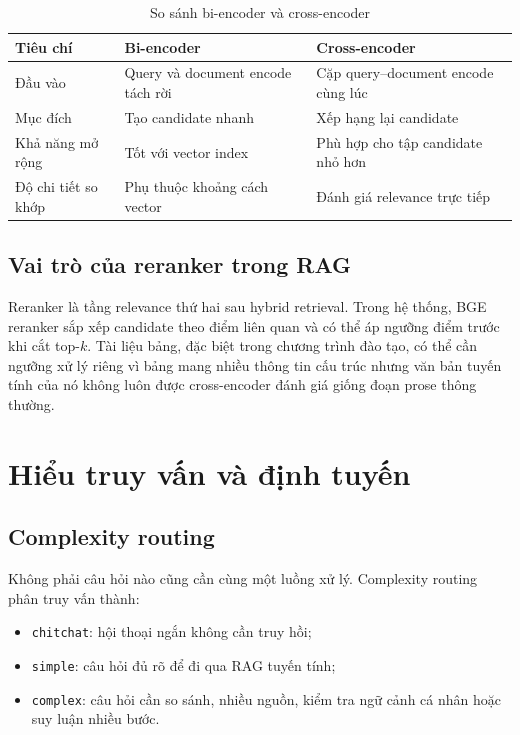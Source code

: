 \documentclass[../DoAn.tex]{subfiles}
\begin{document}
\begin{table}[h]
\centering
\begin{tabular}{|l|p{4.2cm}|p{4.2cm}|}
\hline
\textbf{Tiêu chí} & \textbf{Bi-encoder} & \textbf{Cross-encoder} \\
\hline
Đầu vào & Query và document encode tách rời & Cặp query--document encode cùng lúc \\
\hline
Mục đích & Tạo candidate nhanh & Xếp hạng lại candidate \\
\hline
Khả năng mở rộng & Tốt với vector index & Phù hợp cho tập candidate nhỏ hơn \\
\hline
Độ chi tiết so khớp & Phụ thuộc khoảng cách vector & Đánh giá relevance trực tiếp \\
\hline
\end{tabular}
\caption{So sánh bi-encoder và cross-encoder}
\end{table}

\subsection{Vai trò của reranker trong RAG}

Reranker là tầng relevance thứ hai sau hybrid retrieval. Trong hệ thống, BGE
reranker sắp xếp candidate theo điểm liên quan và có thể áp ngưỡng điểm trước khi
cắt top-$k$. Tài liệu bảng, đặc biệt trong chương trình đào tạo, có thể cần ngưỡng
xử lý riêng vì bảng mang nhiều thông tin cấu trúc nhưng văn bản tuyến tính của nó
không luôn được cross-encoder đánh giá giống đoạn prose thông thường.

\section{Hiểu truy vấn và định tuyến}

\subsection{Complexity routing}

Không phải câu hỏi nào cũng cần cùng một luồng xử lý. Complexity routing phân
truy vấn thành:

\begin{itemize}
    \item \texttt{chitchat}: hội thoại ngắn không cần truy hồi;
    \item \texttt{simple}: câu hỏi đủ rõ để đi qua RAG tuyến tính;
    \item \texttt{complex}: câu hỏi cần so sánh, nhiều nguồn, kiểm tra ngữ cảnh cá
    nhân hoặc suy luận nhiều bước.
\end{itemize}
\end{document}
